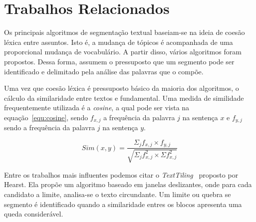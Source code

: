
\section{Trabalhos Relacionados}
	\label{sec:trabalhos}






Os principais algoritmos de segmentação textual baseiam-se na ideia de coesão léxica entre assuntos. Isto é, a mudança de tópicos é acompanhada de uma proporcional mudança de vocabulário. A partir disso, vários algoritmos foram propostos. Dessa forma, assumem o pressuposto que um segmento pode ser identificado e delimitado pela análise das palavras que o compõe.

Uma vez que coesão léxica é pressuposto básico da maioria dos algoritmos, o cálculo da similaridade entre textos e fundamental. Uma medida de similidade frequentemente utilizada é a \textit{cosine}, a qual pode ser vista na equação~\ref{equ:cosine}, sendo $f_{x,j}$ a frequência da palavra $j$ na sentença $x$ e $f_{y,j}$ sendo a frequência da palavra $j$ na sentença $y$.


\begin{equation}
Sim(x,y) = \frac
{\Sigma_j f_{x,j} \times f_{y,j}}
{\sqrt{\Sigma_j f^2_{x,j} \times \Sigma f^2_{x,j}}}
\label{equ:cosine}
\end{equation}










Entre os trabalhos mais influentes podemos citar o \textit{TextTiling}~\cite{Hearst1994} proposto por Hearst. Ela propõe um algoritmo baseado em janelas deslizantes, onde para cada candidato a limite, analisa-se o texto circundante. Um limite ou quebra se segmento é identificado quando a similaridade entres os blocos apresenta uma queda considerável.


